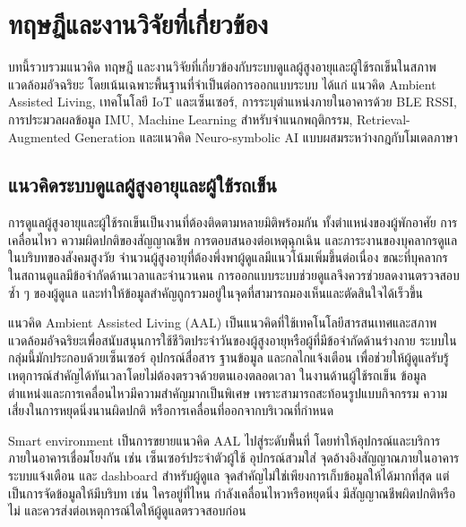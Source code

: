 
\chapter{ทฤษฎีและงานวิจัยที่เกี่ยวข้อง}
\label{chapter2}

บทนี้รวบรวมแนวคิด ทฤษฎี และงานวิจัยที่เกี่ยวข้องกับระบบดูแลผู้สูงอายุและผู้ใช้รถเข็นในสภาพแวดล้อมอัจฉริยะ โดยเน้นเฉพาะพื้นฐานที่จำเป็นต่อการออกแบบระบบ ได้แก่ แนวคิด Ambient Assisted Living, เทคโนโลยี IoT และเซ็นเซอร์, การระบุตำแหน่งภายในอาคารด้วย BLE RSSI, การประมวลผลข้อมูล IMU, Machine Learning สำหรับจำแนกพฤติกรรม, Retrieval-Augmented Generation และแนวคิด Neuro-symbolic AI แบบผสมระหว่างกฎกับโมเดลภาษา

\section{แนวคิดระบบดูแลผู้สูงอายุและผู้ใช้รถเข็น}
\label{sec:ch2_elderly_wheelchair_care}

การดูแลผู้สูงอายุและผู้ใช้รถเข็นเป็นงานที่ต้องติดตามหลายมิติพร้อมกัน ทั้งตำแหน่งของผู้พักอาศัย การเคลื่อนไหว ความผิดปกติของสัญญาณชีพ การตอบสนองต่อเหตุฉุกเฉิน และภาระงานของบุคลากรดูแล ในบริบทของสังคมสูงวัย จำนวนผู้สูงอายุที่ต้องพึ่งพาผู้ดูแลมีแนวโน้มเพิ่มขึ้นต่อเนื่อง ขณะที่บุคลากรในสถานดูแลมีข้อจำกัดด้านเวลาและจำนวนคน การออกแบบระบบช่วยดูแลจึงควรช่วยลดงานตรวจสอบซ้ำ ๆ ของผู้ดูแล และทำให้ข้อมูลสำคัญถูกรวมอยู่ในจุดที่สามารถมองเห็นและตัดสินใจได้เร็วขึ้น \cite{WHO2021DecadeAgeing,Schulz2020CaregiverBurden}

แนวคิด Ambient Assisted Living (AAL) เป็นแนวคิดที่ใช้เทคโนโลยีสารสนเทศและสภาพแวดล้อมอัจฉริยะเพื่อสนับสนุนการใช้ชีวิตประจำวันของผู้สูงอายุหรือผู้ที่มีข้อจำกัดด้านร่างกาย ระบบในกลุ่มนี้มักประกอบด้วยเซ็นเซอร์ อุปกรณ์สื่อสาร ฐานข้อมูล และกลไกแจ้งเตือน เพื่อช่วยให้ผู้ดูแลรับรู้เหตุการณ์สำคัญได้ทันเวลาโดยไม่ต้องตรวจด้วยตนเองตลอดเวลา \cite{Rashidi2013AALSurvey} ในงานด้านผู้ใช้รถเข็น ข้อมูลตำแหน่งและการเคลื่อนไหวมีความสำคัญมากเป็นพิเศษ เพราะสามารถสะท้อนรูปแบบกิจกรรม ความเสี่ยงในการหยุดนิ่งนานผิดปกติ หรือการเคลื่อนที่ออกจากบริเวณที่กำหนด

Smart environment เป็นการขยายแนวคิด AAL ไปสู่ระดับพื้นที่ โดยทำให้อุปกรณ์และบริการภายในอาคารเชื่อมโยงกัน เช่น เซ็นเซอร์ประจำตัวผู้ใช้ อุปกรณ์สวมใส่ จุดอ้างอิงสัญญาณภายในอาคาร ระบบแจ้งเตือน และ dashboard สำหรับผู้ดูแล จุดสำคัญไม่ใช่เพียงการเก็บข้อมูลให้ได้มากที่สุด แต่เป็นการจัดข้อมูลให้มีบริบท เช่น ใครอยู่ที่ไหน กำลังเคลื่อนไหวหรือหยุดนิ่ง มีสัญญาณชีพผิดปกติหรือไม่ และควรส่งต่อเหตุการณ์ใดให้ผู้ดูแลตรวจสอบก่อน

